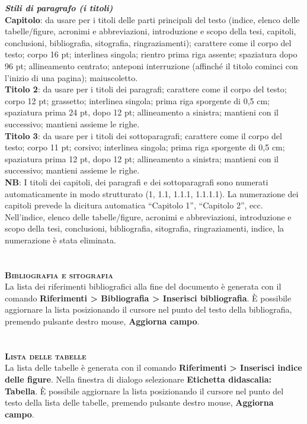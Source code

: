 \textit{\textbf{Stili di paragrafo (i titoli)}} \\

\textbf{Capitolo}: da usare per i titoli delle parti principali del testo (indice, elenco delle tabelle/figure, acronimi e abbreviazioni, introduzione e scopo della tesi, capitoli, conclusioni, bibliografia, sitografia, ringraziamenti); carattere come il corpo del testo; corpo 16 pt; interlinea singola; rientro prima riga assente; spaziatura dopo 96 pt; allineamento centrato; anteponi interruzione (affinché il titolo cominci con l’inizio di una pagina); maiuscoletto. \\

\textbf{Titolo 2}: da usare per i titoli dei paragrafi; carattere come il corpo del testo; corpo 12 pt; grassetto; interlinea singola; prima riga sporgente di 0,5 cm; spaziatura prima 24 pt, dopo 12 pt; allineamento a sinistra; mantieni con il successivo; mantieni assieme le righe. \\

\textbf{Titolo 3}: da usare per i titoli dei sottoparagrafi; carattere come il corpo del testo; corpo 11 pt; corsivo; interlinea singola; prima riga sporgente di 0,5 cm; spaziatura prima 12 pt, dopo 12 pt; allineamento a sinistra; mantieni con il successivo; mantieni assieme le righe. \\

\textbf{NB}: I titoli dei capitoli, dei paragrafi e dei sottoparagrafi sono numerati automaticamente in modo strutturato (1, 1.1, 1.1.1, 1.1.1.1). La numerazione dei capitoli prevede la dicitura automatica “Capitolo 1”, “Capitolo 2”, ecc. Nell’indice, elenco delle tabelle/figure, acronimi e abbreviazioni, introduzione e scopo della tesi, conclusioni, bibliografia, sitografia, ringraziamenti, indice, la numerazione è stata eliminata. \\ \\ \\

\textbf{\scshape Bibliografia e sitografia} \\
La lista dei riferimenti bibliografici alla fine del documento è generata con il comando \textbf{Riferimenti > Bibliografia > Inserisci bibliografia}. È possibile aggiornare la lista posizionando il cursore nel punto del testo della bibliografia, premendo pulsante destro mouse, \textbf{Aggiorna campo}.\\  \\ \\

\textbf{\scshape Lista delle tabelle}\\
La lista delle tabelle è generata con il comando \textbf{Riferimenti > Inserisci indice delle figure}. Nella finestra di dialogo selezionare \textbf{Etichetta didascalia: Tabella}. È possibile aggiornare la lista posizionando il cursore nel punto del testo della lista delle tabelle, premendo pulsante destro mouse, \textbf{Aggiorna campo}.  \\ \\ \\

